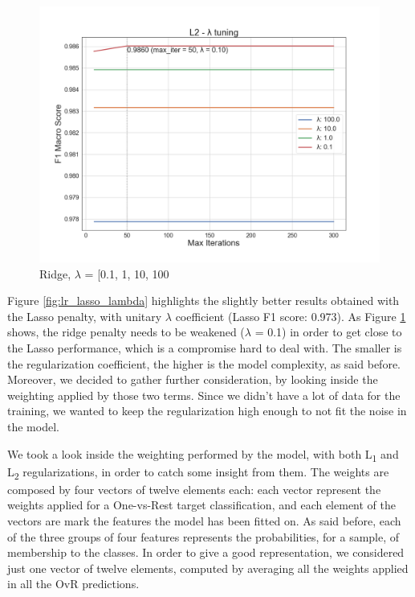\begin{figure}
	\includegraphics[width=\columnwidth]{chapter5/figure/logreg_l2_lambda.png}\par 
	\caption{Ridge, $ \lambda$ = [0.1, 1, 10, 100}
	\label{fig:lr_ridge_lambda}
\end{figure}

Figure \ref{fig:lr_lasso_lambda} highlights the slightly better results obtained with the Lasso penalty, with unitary $ \lambda $ coefficient (Lasso F1 score: 0.973).
As Figure \ref{fig:lr_ridge_lambda} shows, the ridge penalty needs to be weakened ($ \lambda $ = 0.1) in order to get close to the Lasso performance, which is a compromise hard to deal with. The smaller  is the regularization coefficient, the higher is the model complexity, as said before.
Moreover, we decided to gather further consideration, by looking inside the weighting applied by those two terms.
Since we didn't have a lot of data for the training, we wanted to keep the regularization high enough to not fit the noise in the model.

We took a look inside the weighting performed by the model, with both L\textsubscript{1} and L\textsubscript{2} regularizations, in order to catch some insight from them.
The weights are composed by four vectors of twelve elements each: each vector represent the weights applied for a One-vs-Rest target classification, and each element of the vectors are mark the features the model has been fitted on. As said before, each of the three groups of four features represents the probabilities, for a sample, of membership to the classes.
In order to give a good representation, we considered just one vector of twelve elements, computed by averaging all the weights applied in all the OvR predictions.

